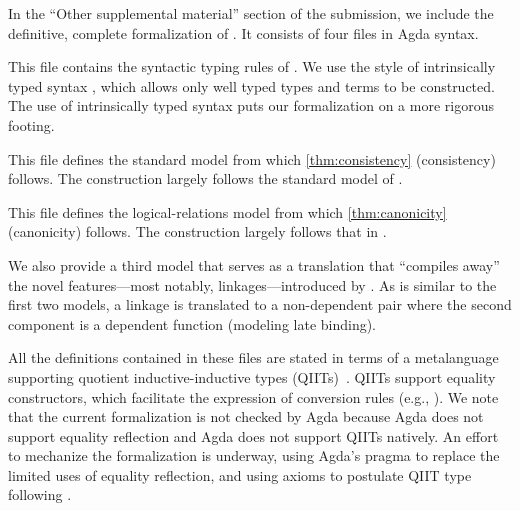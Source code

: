 In the ``Other supplemental material'' section of the submission, we
include the definitive, complete formalization of \TT.
It consists of four files in Agda syntax.
%

\begin{description}[
    itemsep=.5ex,topsep=.6ex,
    labelsep=1.5ex,
    leftmargin=6.5ex,
    font=\ttfamily\bfseries,
]

\item[Syntax.agda]

This file contains the syntactic typing rules of \TT.
We use the style of intrinsically typed syntax \cite{chapman2009type},
which allows only well typed \TT types and terms to be constructed.
The use of intrinsically typed syntax puts our formalization on a more
rigorous footing.

\item[Semantic.agda]

This file defines the standard model from which
\cref{thm:consistency} (consistency) follows.
%
The construction largely follows the standard model of
\cite{altkap2016,kaposi2017type,kaposi2019gluing}.

\item[Canonicity.agda]

This file defines the logical-relations model from which
\cref{thm:canonicity} (canonicity) follows.
%
The construction largely follows that in
\cite{coquand2018canonicity,sterling2019algebraic}.

\item[SynTranslation.agda]

We also provide a third model that serves as a translation that ``compiles
away'' the novel features---most notably, linkages---introduced by \TT.
As is similar to the first two models, 
a linkage is translated to a non-dependent pair where the
second component is a dependent function (modeling late binding).

\end{description}

All the definitions contained in these files are stated in
terms of a meta\-language supporting quotient inductive-inductive types
(QIITs)~\cite{nordvall2010inductive,altkap2016}.
QIITs support equality constructors, which facilitate the expression of
conversion rules (e.g., ).
%
We note that the current formalization is not checked by Agda because
Agda does not support equality reflection and Agda does not support QIITs natively.
An effort to mechanize the formalization is underway, using Agda's
 pragma to replace the limited uses of equality reflection, 
and using axioms to postulate QIIT type following \cite{altkap2016}.

